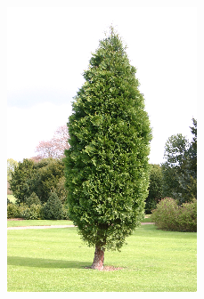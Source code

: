 \documentclass{article} %
\begin{document}
\begin{figure}
	\begin{subfigure}[c]{\textwidth}
		\centering
		\begin{subfigure}[c]{0.195\textwidth}
			\includegraphics[width = \textwidth]{./img/2_21_s.png}
			\label{fig:2_21_s}
		\end{subfigure}
		\begin{subfigure}[c]{0.195\textwidth}

\end{subfigure}
\end{subfigure}
\end{figure}
\end{document}
